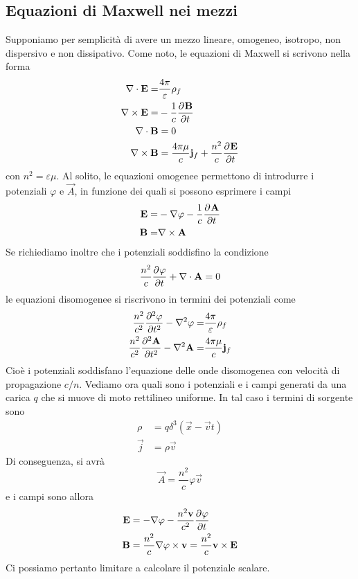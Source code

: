 \documentclass{article}
\begin{document}
	\subsection{Equazioni di Maxwell nei mezzi}
	Supponiamo per semplicità di avere un mezzo lineare, omogeneo, isotropo, non dispersivo e non dissipativo. Come noto, le equazioni di Maxwell si scrivono nella forma
	\begin{align*}
		\nabla\cdot\vec{E}=&\frac{4\pi}{\varepsilon}\rho_f\\\nabla\times\vec{E}=&-\frac{1}{c}\pder{\vec{B}}{t}\\\nabla\cdot\vec{B}&=0\\\nabla\times\vec{B}&=\frac{4\pi\mu}{c}\vec{j}_f+\frac{n^2}{c}\pder{\vec{E}}{t}
	\end{align*}
	con $n^2=\varepsilon\mu$. Al solito, le equazioni omogenee permettono di introdurre i potenziali $\varphi$ e $\vec{A}$, in funzione dei quali si possono esprimere i campi
	\begin{align*}
		\vec{E}=&-\nabla\varphi-\frac{1}{c}\pder{\vec{A}}{t}\\
		\vec{B}=&\nabla\times\vec{A}
	\end{align*}
	Se richiediamo inoltre che i potenziali soddisfino la condizione
	\[\frac{n^2}{c}\pder{\varphi}{t}+\nabla\cdot\vec{A}=0\]
	le equazioni disomogenee si riscrivono in termini dei potenziali come
	\begin{align*}
		\frac{n^2}{c^2}\pder[2]{\varphi}{t}-\lap\varphi=&\frac{4\pi}{\varepsilon}\rho_f\\\frac{n^2}{c^2}\pder[2]{\vec{A}}{t}-\lap\vec{A}=&\frac{4\pi\mu}{c}\vec{j}_f
	\end{align*}
	Cioè i potenziali soddisfano l'equazione delle onde disomogenea con velocità di propagazione $c/n$. Vediamo ora quali sono i potenziali e i campi generati da una carica $q$ che si muove di moto rettilineo uniforme. In tal caso i termini di sorgente sono
	\begin{align*}
		\rho&=q\delta^3(\vec{x}-\vec{v}t)\\\vec{j}&=\rho\vec{v}
	\end{align*}
	Di conseguenza, si avrà
	\[\vec{A}=\frac{n^2}{c}\varphi\vec{v}\]
	e i campi sono allora
	\begin{align*}
		\vec{E}&=-\nabla\varphi-\frac{n^2\vec{v}}{c^2}\pder{\varphi}{t}\\\vec{B}&=\frac{n^2}{c}\nabla\varphi\times\vec{v}=\frac{n^2}{c}\vec{v}\times\vec{E}
	\end{align*}
	Ci possiamo pertanto limitare a calcolare il potenziale scalare.
\end{document}
